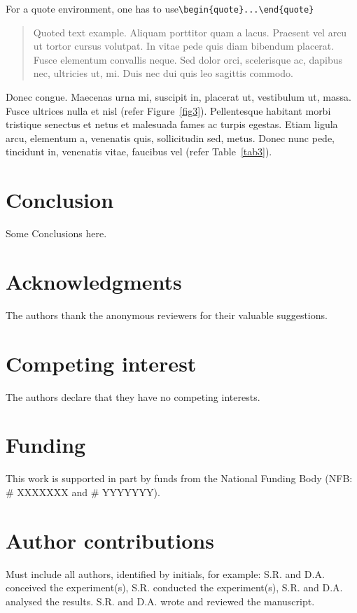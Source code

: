 \documentclass[unnumsec,webpdf,modern,large]{oup-authoring-template}%
\theoremstyle{thmstyleone}%
\theoremstyle{thmstyletwo}%
\theoremstyle{thmstylethree}%
\begin{document}
\noindent
For a quote environment, one has to use\newline \verb+\begin{quote}...\end{quote}+
\begin{quote}
Quoted text example. Aliquam porttitor quam a lacus. Praesent vel arcu ut tortor cursus volutpat. In vitae pede quis diam bibendum placerat. Fusce elementum
convallis neque. Sed dolor orci, scelerisque ac, dapibus nec, ultricies ut, mi. Duis nec dui quis leo sagittis commodo.
\end{quote}
Donec congue. Maecenas urna mi, suscipit in, placerat ut, vestibulum ut, massa. Fusce ultrices nulla et nisl (refer Figure~\ref{fig3}). Pellentesque habitant morbi tristique senectus et netus et malesuada fames ac turpis egestas. Etiam ligula arcu,
elementum a, venenatis quis, sollicitudin sed, metus. Donec nunc pede, tincidunt in, venenatis vitae, faucibus vel (refer Table~\ref{tab3}).

\section{Conclusion}

Some Conclusions here.

\section{Acknowledgments}
The authors thank the anonymous reviewers for their valuable suggestions. 

\section{Competing interest}
The authors declare that they have no competing interests.

\section{Funding}
This work is supported in part by funds from the National Funding Body (NFB: \# XXXXXXX and \# YYYYYYY).

\section{Author contributions}

Must include all authors, identified by initials, for example:
S.R. and D.A. conceived the experiment(s),  S.R. conducted the experiment(s), S.R. and D.A. analysed the results.  S.R. and D.A. wrote and reviewed the manuscript.
\end{document}
